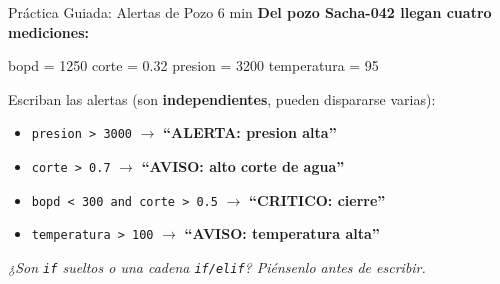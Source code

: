 \documentclass[aspectratio=169, 11pt]{beamer}
\begin{document}
\begin{frame}[fragile,shrink=6]{Práctica Guiada: Alertas de Pozo \hfill {\normalsize\color{arcaRed}\faClock\hspace{4pt}6 min}}
  \vspace{-4pt}
  {\small\color{arcaDark}\bfseries
    Del pozo Sacha-042 llegan cuatro mediciones:}

  \vspace{3pt}
  \begin{pyblock}
bopd = 1250
corte = 0.32
presion = 3200
temperatura = 95
  \end{pyblock}

  \vspace{3pt}
  {\footnotesize\color{textMuted}Escriban las alertas (son \textbf{independientes}, pueden dispararse varias):}

  \vspace{2pt}
  {\footnotesize
  \begin{itemize}\setlength{\itemsep}{1pt}
    \item[{\color{arcaRed}\scriptsize\faExclamationCircle}]
      \texttt{presion > 3000} $\to$ \textbf{``ALERTA: presion alta''}
    \item[{\color{arcaRed}\scriptsize\faExclamationCircle}]
      \texttt{corte > 0.7} $\to$ \textbf{``AVISO: alto corte de agua''}
    \item[{\color{arcaRed}\scriptsize\faExclamationCircle}]
      \texttt{bopd < 300 and corte > 0.5} $\to$ \textbf{``CRITICO: cierre''}
    \item[{\color{arcaRed}\scriptsize\faExclamationCircle}]
      \texttt{temperatura > 100} $\to$ \textbf{``AVISO: temperatura alta''}
  \end{itemize}
  }

  \vspace{3pt}
  {\scriptsize\color{textMuted}\itshape
    \faLightbulb[regular]\hspace{3pt}%
    ¿Son \texttt{if} sueltos o una cadena \texttt{if/elif}? Piénsenlo antes de escribir.}
\end{frame}
\end{document}
